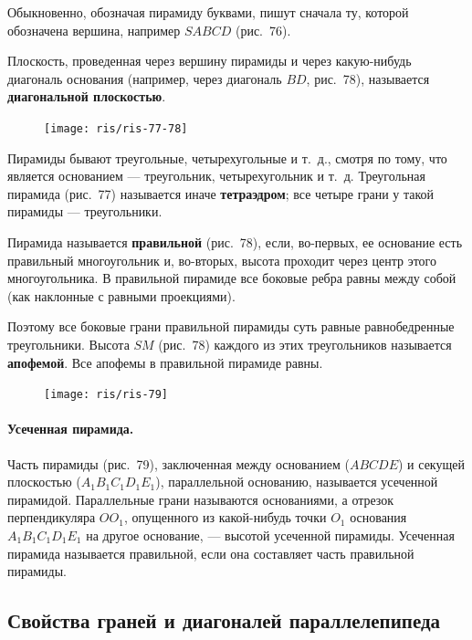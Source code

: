 \documentclass[twoside]{book}
\begin{document}
Обыкновенно, обозначая пирамиду буквами, пишут сначала ту, которой обозначена вершина, например $SABCD$ (рис.~76).

Плоскость, проведенная через вершину пирамиды и через какую-нибудь диагональ основания (например, через диагональ $BD$, рис.~78), называется \textbf{диагональной плоскостью}.

\begin{figure}[h!]
\centering
\texttt{[image: ris/ris-77-78]}
\caption{}
\end{figure}

Пирамиды бывают треугольные, четырехугольные и т.~д., смотря по тому, что является основанием --- треугольник, четырехугольник и т.~д.
Треугольная пирамида (рис.~77) называется иначе \textbf{тетраэдром};
все четыре грани у такой пирамиды --- треугольники. %

Пирамида называется \textbf{правильной} (рис.~78), если, во-первых, ее основание есть правильный многоугольник и, во-вторых, высота проходит через центр этого многоугольника.
В правильной пирамиде все боковые ребра равны между собой (как наклонные с равными проекциями).

Поэтому все боковые грани правильной пирамиды суть равные равнобедренные треугольники. %
Высота $SM$ (рис.~78) каждого из этих треугольников называется \textbf{апофемой}.
Все апофемы в правильной пирамиде равны.

\begin{figure}[h!]
\centering
\texttt{[image: ris/ris-79]}
\caption{}
\end{figure}

\paragraph{Усеченная пирамида.}\label{1938/s71}
Часть пирамиды (рис.~79), заключенная между основанием ($ABCDE$) и секущей плоскостью ($A_1B_1C_1D_1E_1$), параллельной основанию, называется усеченной пирамидой.
Параллельные грани называются основаниями, а отрезок перпендикуляра $OO_1$, опущенного из какой-нибудь точки $O_1$ основания $A_1B_1C_1D_1E_1$ на другое основание, --- высотой усеченной пирамиды.
Усеченная пирамида называется правильной, если она составляет часть правильной пирамиды.

\subsection*{Свойства граней и диагоналей параллелепипеда}
\end{document}

